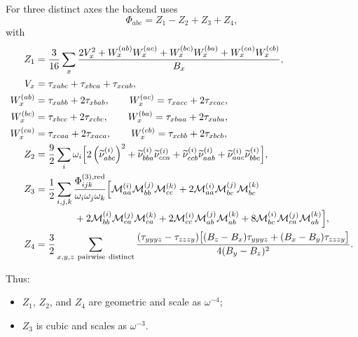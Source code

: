 For three distinct axes the backend uses
\begin{equation}
\Phi_{abc}=Z_1-Z_2+Z_3+Z_4,
\end{equation}
with
\begin{align}
Z_1
&=
\frac{3}{16}\sum_x
\frac{
2V_x^2
+W_x^{(ab)}W_x^{(ac)}
+W_x^{(bc)}W_x^{(ba)}
+W_x^{(ca)}W_x^{(cb)}
}{B_x},
\\
V_x &= \tau_{xabc}+\tau_{xbca}+\tau_{xcab},
\\
W_x^{(ab)} &= \tau_{xabb}+2\tau_{xbab},
\qquad
W_x^{(ac)} = \tau_{xacc}+2\tau_{xcac},
\\
W_x^{(bc)} &= \tau_{xbcc}+2\tau_{xcbc},
\qquad
W_x^{(ba)} = \tau_{xbaa}+2\tau_{xaba},
\\
W_x^{(ca)} &= \tau_{xcaa}+2\tau_{xaca},
\qquad
W_x^{(cb)} = \tau_{xcbb}+2\tau_{xbcb},
\\
Z_2
&=
\frac{9}{2}\sum_i\omega_i
\Big[
2\left(\widetilde{\nu}^{(i)}_{abc}\right)^2
+\widetilde{\nu}^{(i)}_{bba}\widetilde{\nu}^{(i)}_{cca}
+\widetilde{\nu}^{(i)}_{ccb}\widetilde{\nu}^{(i)}_{aab}
+\widetilde{\nu}^{(i)}_{aac}\widetilde{\nu}^{(i)}_{bbc}
\Big],
\\
Z_3
&=
\frac{1}{2}\sum_{i,j,k}
\frac{\Phi^{(3),\mathrm{red}}_{ijk}}{\omega_i\omega_j\omega_k}
\Big[
\mathcal{M}^{(i)}_{aa}\mathcal{M}^{(j)}_{bb}\mathcal{M}^{(k)}_{cc}
+2\mathcal{M}^{(i)}_{aa}\mathcal{M}^{(j)}_{bc}\mathcal{M}^{(k)}_{bc}
\notag\\
&\qquad\qquad
+2\mathcal{M}^{(i)}_{bb}\mathcal{M}^{(j)}_{ca}\mathcal{M}^{(k)}_{ca}
+2\mathcal{M}^{(i)}_{cc}\mathcal{M}^{(j)}_{ab}\mathcal{M}^{(k)}_{ab}
+8\mathcal{M}^{(i)}_{bc}\mathcal{M}^{(j)}_{ca}\mathcal{M}^{(k)}_{ab}
\Big],
\\
Z_4
&=
\frac{3}{2}
\sum_{x,y,z\ \mathrm{pairwise\ distinct}}
\frac{
(\tau_{yyyz}-\tau_{zzzy})
\big[(B_z-B_x)\tau_{yyyz}+(B_x-B_y)\tau_{zzzy}\big]
}
{4(B_y-B_z)^2}.
\end{align}

Thus:
\begin{itemize}
\item $Z_1$, $Z_2$, and $Z_4$ are geometric and scale as $\omega^{-4}$;
\item $Z_3$ is cubic and scales as $\omega^{-3}$.
\end{itemize}

